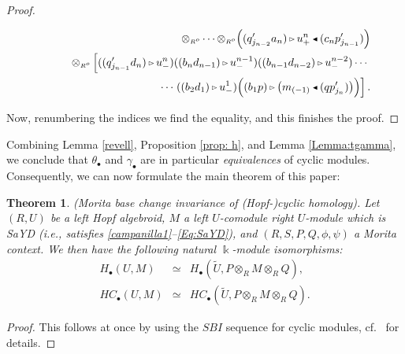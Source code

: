 \documentclass[reqno, a4paper, 10pt]{amsart}
\numberwithin{equation}{section}
\theoremstyle{plain}
\newtheorem{thm}[theorem]{Theorem}
\theoremstyle{definition}
\theoremstyle{remark}
\begin{document}
\begin{proof}
\begin{footnotesize}
\begin{eqnarray*}
&& \qquad  
{\otimes_{\scriptscriptstyle{{\scriptscriptstyle{{R^{o}}}}}}} \cdots{\otimes_{\scriptscriptstyle{{\scriptscriptstyle{{R^{o}}}}}}}\Big( (q_{j_{n-2}}'a_n) {{\,\raise1pt\hbox{$\scriptscriptstyle{\rhd}$} \, }} u_{+}^n {{\,\raise1pt\hbox{$\scriptscriptstyle{\blacktriangleleft}$} \, }} (c_np_{j_{n-1}}')\Big) \\ 
&& \qquad 
{\otimes_{\scriptscriptstyle{{\scriptscriptstyle{{R^{o}}}}}}}\left[\underset{}{} ((q_{j_{n-1}}'d_n){{\,\raise1pt\hbox{$\scriptscriptstyle{\rhd}$} \, }} u^n_{-})((b_nd_{n-1}) {{\,\raise1pt\hbox{$\scriptscriptstyle{\rhd}$} \, }} u^{n-1}_{-}) ((b_{n-1}d_{n-2}) {{\,\raise1pt\hbox{$\scriptscriptstyle{\rhd}$} \, }} u^{n-2}_{-}) \cdots \right. \\ 
&& \qquad \qquad
\cdots \left.\underset{}{} ((b_2d_1) {{\,\raise1pt\hbox{$\scriptscriptstyle{\rhd}$} \, }} u^1_{-}) \Big( (b_1p) {{\,\raise1pt\hbox{$\scriptscriptstyle{\rhd}$} \, }} {\big( { m_{(-1)} {{\,\raise1pt\hbox{$\scriptscriptstyle{\blacktriangleleft}$} \, }} (qp_{j_n}') } \big)} \Big) \right].
\end{eqnarray*}
\end{footnotesize}
Now, renumbering the indices we find the equality, and this finishes the proof.
\end{proof}

Combining Lemma \ref{revell}, Proposition \ref{prop: h}, and Lemma \ref{Lemma:tgamma}, 
we conclude that $\theta_{{\scriptscriptstyle{\bullet}}}$ and $\gamma_{{\scriptscriptstyle{\bullet}}}$ are in particular {\em equivalences} of cyclic modules. Consequently, we 
can now formulate the main theorem of this paper:
\begin{thm}
\label{thm:main1}
{\rm (Morita base change invariance of (Hopf-)cyclic homology).}
Let $(R, U)$ be a left Hopf algebroid, $M$ a left $U$-comodule right $U$-module which is SaYD (i.e., satisfies \eqref{campanilla1}--\eqref{Eq:SaYD}), and $(R,S,P,Q,\phi,\psi)$ a Morita context. We then have the following natural $\Bbbk$-module isomorphisms:
\begin{eqnarray*}
H_{{\scriptscriptstyle{\bullet}}}(U, M) &\simeq& H_{{\scriptscriptstyle{\bullet}}}({\tilde{{U}}}, P \otimes_{{\scriptscriptstyle{R}}} M \otimes_{{\scriptscriptstyle{R}}} Q), \\
HC_{{\scriptscriptstyle{\bullet}}}(U, M) &\simeq& HC_{{\scriptscriptstyle{\bullet}}}({\tilde{{U}}}, P \otimes_{{\scriptscriptstyle{R}}} M \otimes_{{\scriptscriptstyle{R}}} Q). 
\end{eqnarray*}
\end{thm}
\begin{proof}
This follows at once by using the $SBI$ sequence for cyclic modules, cf.~\cite[\S2.5.12]{Lod:CH} for details.
\end{proof}
\end{document}
